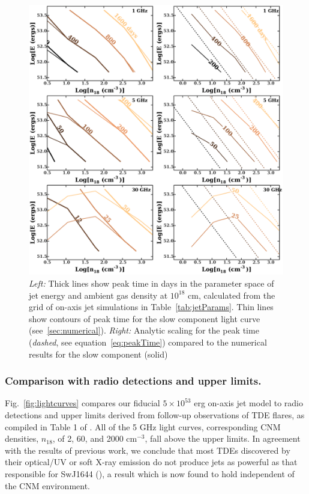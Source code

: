 \documentclass[usenatbib,fleqn]{mnras}
\begin{document}
\begin{figure}
  \includegraphics[width=16cm]{tp_contours_new.pdf}
  \caption{\label{fig:ContoursTp} {\it {Left:}} Thick lines show peak
    time in days in the parameter space of jet energy and ambient gas
    density at $10^{18}$ cm, calculated from the grid of on-axis jet
    simulations in Table~\ref{tab:jetParams}. Thin lines show contours
    of peak time for the slow component light curve
    (see~\ref{sec:numerical}). {\it Right:} Analytic scaling for the
    peak time ({\it dashed}, see equation~\ref{eq:peakTime}) compared
    to the numerical results for the slow component (solid)}
\end{figure}

\subsubsection{Comparison with radio detections and upper limits.}
\label{sec:upLims}

Fig.~\ref{fig:lightcurves} compares our fiducial $5\times 10^{53}$ erg
on-axis jet model to radio detections and upper limits derived from
follow-up observations of TDE flares, as compiled in Table 1 of
\citealt{Mimica+2015}.  All of the 5 GHz light curves, corresponding
CNM densities, $n_{18}$, of 2, 60, and 2000 cm$^{-3}$, fall above the upper
limits. In agreement with the results of previous work, we conclude
that most TDEs discovered by their optical/UV or soft X-ray emission
do not produce jets as powerful as that responsible for SwJ1644
(\citealt{Bower+2013,van-Velzen+2013,Mimica+2015}), a result which is
now found to hold independent of the CNM environment.
\end{document}
